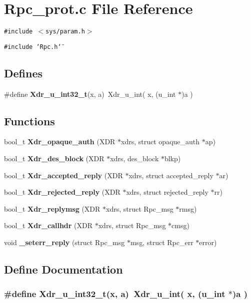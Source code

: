 \section{Rpc\_\-prot.c File Reference}
\label{Rpc__prot_8c}
{\tt \#include $<$sys/param.h$>$}\par
{\tt \#include \char`\"{}Rpc.h\char`\"{}}\par
\subsection*{Defines}
\begin{CompactItemize}
\item 
\#define {\bf Xdr\_\-u\_\-int32\_\-t}(x, a)\ Xdr\_\-u\_\-int( x, (u\_\-int $\ast$)a )
\end{CompactItemize}
\subsection*{Functions}
\begin{CompactItemize}
\item 
bool\_\-t {\bf Xdr\_\-opaque\_\-auth} (XDR $\ast$xdrs, struct opaque\_\-auth $\ast$ap)
\item 
bool\_\-t {\bf Xdr\_\-des\_\-block} (XDR $\ast$xdrs, des\_\-block $\ast$blkp)
\item 
bool\_\-t {\bf Xdr\_\-accepted\_\-reply} (XDR $\ast$xdrs, struct accepted\_\-reply $\ast$ar)
\item 
bool\_\-t {\bf Xdr\_\-rejected\_\-reply} (XDR $\ast$xdrs, struct rejected\_\-reply $\ast$rr)
\item 
bool\_\-t {\bf Xdr\_\-replymsg} (XDR $\ast$xdrs, struct Rpc\_\-msg $\ast$rmsg)
\item 
bool\_\-t {\bf Xdr\_\-callhdr} (XDR $\ast$xdrs, struct Rpc\_\-msg $\ast$cmsg)
\item 
void {\bf \_\-seterr\_\-reply} (struct Rpc\_\-msg $\ast$msg, struct Rpc\_\-err $\ast$error)
\end{CompactItemize}


\subsection{Define Documentation}
\subsubsection{\setlength{\rightskip}{0pt plus 5cm}\#define Xdr\_\-u\_\-int32\_\-t(x, a)\ Xdr\_\-u\_\-int( x, (u\_\-int $\ast$)a )}\label{Rpc__prot_8c_a0}




